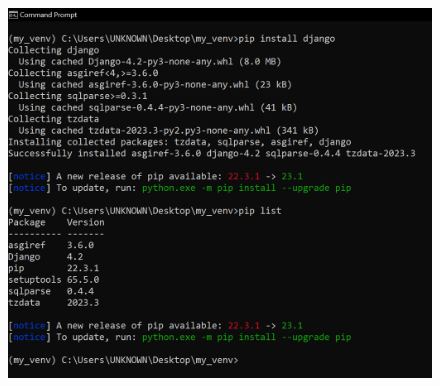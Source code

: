 \documentclass[12pt]{article}
\begin{document}
	\begin{figure}[H]
		\centering
		\includegraphics[width =1\textwidth ,keepaspectratio]{imgs/install_dj.png}
		\caption{}
	\end{figure}
\end{document}
